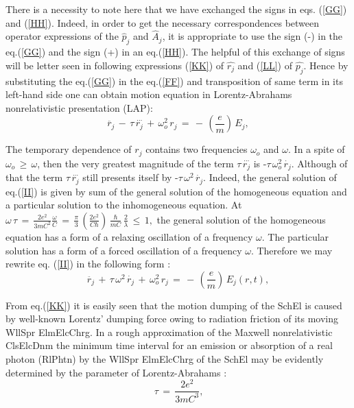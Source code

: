 \documentclass[12pt]{article}
\begin{document}
 There is a necessity to note here that we have exchanged the signs in eqs.
(\ref{GG}) and (\ref{HH}). Indeed, in order to get the necessary
correspondences between operator expressions of the $\hat{p}_j$ and
$\hat{A}_j$, it is appropriate to use the sign (-) in the eq.(\ref{GG})
and the sign (+) in an eq.(\ref{HH}). The helpful of this exchange of
signs will be letter seen in following expressions (\ref{KK}) of $\hat{r_j}$
and (\ref{LL}) of $\hat{p_j}$. Hence by substituting the eq.(\ref{GG}) in
the eq.(\ref{FF}) and transposition of same term in its left-hand side one
can obtain motion equation in Lorentz-Abrahams nonrelativistic presentation
(LAP):
\begin{equation}\label{II}
\ddot{r_j}\,-\,\tau\,\stackrel{\cdots}{r_j}\,+\,\omega_o^2\,r_j\,=
\,-\,(\frac{e}{m})\,E_j,
\end{equation}

The temporary dependence of $r_j$ contains two frequencies $\omega_o$ and
$\omega$. In a spite of $\omega_o\,\ge\,\omega$, then the very greatest
magnitude of the term $\tau\,\stackrel{\cdots}{r_j}$ is
-$\tau\,\omega_o^2\,\dot{r_j}$. Although of that the term
 $\tau\,\stackrel{\cdots}{r_j}$ still presents itself by
-$\tau\,\omega^2\,\dot{r_j}$. Indeed, the general solution of
eq.(\ref{II}) is given by sum of the general solution of the homogeneous
equation and a particular solution to the inhomogeneous equation. At
$\omega\,\tau\,=\,\frac{2e^2}{3mC^2}\frac{\omega}{C}\,=\,\frac{\pi}{3}\,
(\frac{2e^2}{C\hbar})\,\frac{\hbar}{mC}\,\frac{2}{\lambda}\,\le\,1,$
the general solution of the homogeneous equation has a form of a relaxing
oscillation of a frequency $\omega$. The particular solution has a form of
a forced oscillation of a frequency $\omega$. Therefore we may rewrite eq.
(\ref{II}) in the following form :
\begin{equation}\label{KK}
\ddot{r_j}\,+\,\tau\,\omega^2\,\dot{r_j}\,+\,\omega_o^2\,r_j\,=
\,-\,(\frac{e}{m})\,E_j(r,t),
\end{equation}

 From eq.(\ref{KK}) it is easily seen that the motion dumping of the SchEl
is caused by well-known Lorentz' dumping force owing to radiation friction
of its moving WllSpr ElmElcChrg. In a rough approximation of the Maxwell
nonrelativistic ClsElcDnm the minimum time interval for an emission or
absorption of a real photon (RlPhtn) by the WllSpr ElmElcChrg of the SchEl
may be evidently determined by the parameter of Lorentz-Abrahams :
\begin{equation}\label{LL}
\,\tau\,=\,\frac{2e^2}{3mC^3},
\end{equation}
\end{document}
